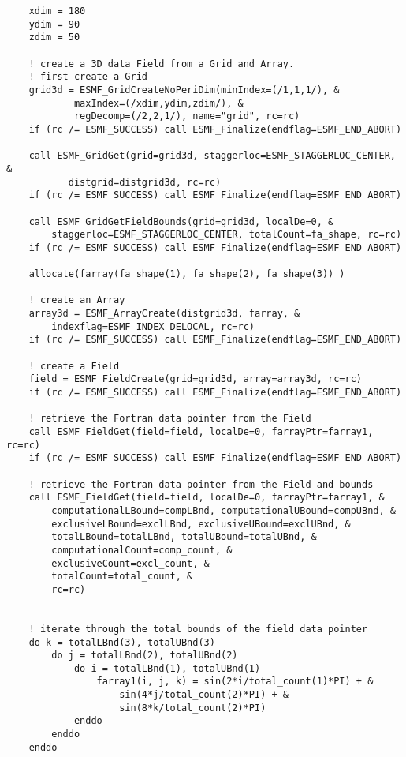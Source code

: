  \begin{verbatim}
    xdim = 180
    ydim = 90
    zdim = 50

    ! create a 3D data Field from a Grid and Array.
    ! first create a Grid
    grid3d = ESMF_GridCreateNoPeriDim(minIndex=(/1,1,1/), &
            maxIndex=(/xdim,ydim,zdim/), &
            regDecomp=(/2,2,1/), name="grid", rc=rc)
    if (rc /= ESMF_SUCCESS) call ESMF_Finalize(endflag=ESMF_END_ABORT)

    call ESMF_GridGet(grid=grid3d, staggerloc=ESMF_STAGGERLOC_CENTER, &
           distgrid=distgrid3d, rc=rc)
    if (rc /= ESMF_SUCCESS) call ESMF_Finalize(endflag=ESMF_END_ABORT)

    call ESMF_GridGetFieldBounds(grid=grid3d, localDe=0, &
        staggerloc=ESMF_STAGGERLOC_CENTER, totalCount=fa_shape, rc=rc)
    if (rc /= ESMF_SUCCESS) call ESMF_Finalize(endflag=ESMF_END_ABORT)

    allocate(farray(fa_shape(1), fa_shape(2), fa_shape(3)) )

    ! create an Array
    array3d = ESMF_ArrayCreate(distgrid3d, farray, &
        indexflag=ESMF_INDEX_DELOCAL, rc=rc)
    if (rc /= ESMF_SUCCESS) call ESMF_Finalize(endflag=ESMF_END_ABORT)

    ! create a Field
    field = ESMF_FieldCreate(grid=grid3d, array=array3d, rc=rc)
    if (rc /= ESMF_SUCCESS) call ESMF_Finalize(endflag=ESMF_END_ABORT)

    ! retrieve the Fortran data pointer from the Field
    call ESMF_FieldGet(field=field, localDe=0, farrayPtr=farray1, rc=rc)
    if (rc /= ESMF_SUCCESS) call ESMF_Finalize(endflag=ESMF_END_ABORT)

    ! retrieve the Fortran data pointer from the Field and bounds
    call ESMF_FieldGet(field=field, localDe=0, farrayPtr=farray1, &
        computationalLBound=compLBnd, computationalUBound=compUBnd, &
        exclusiveLBound=exclLBnd, exclusiveUBound=exclUBnd, &
        totalLBound=totalLBnd, totalUBound=totalUBnd, &
        computationalCount=comp_count, &
        exclusiveCount=excl_count, &
        totalCount=total_count, &
        rc=rc)


    ! iterate through the total bounds of the field data pointer
    do k = totalLBnd(3), totalUBnd(3)
        do j = totalLBnd(2), totalUBnd(2)
            do i = totalLBnd(1), totalUBnd(1)
                farray1(i, j, k) = sin(2*i/total_count(1)*PI) + &
                    sin(4*j/total_count(2)*PI) + &
                    sin(8*k/total_count(2)*PI)
            enddo
        enddo
    enddo
 
\end{verbatim}
 
